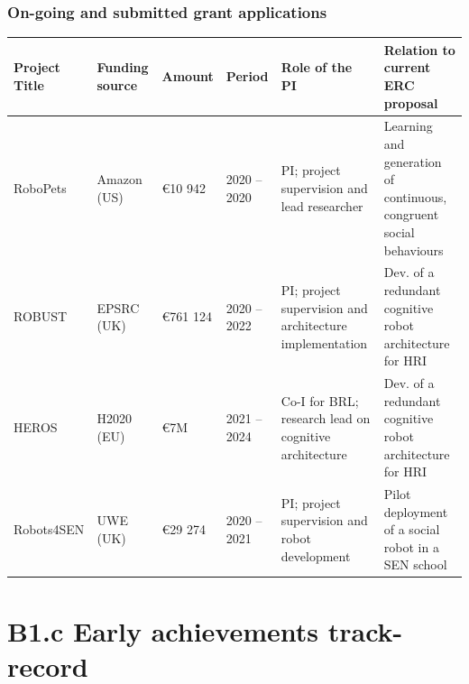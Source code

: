 \documentclass[11pt,a4paper]{report}
\newcommand{\eu}[1]{}
\begin{document}
\subsection{On-going and submitted grant applications}

\begin{tabular}{llllp{4cm}p{4cm}}
\toprule
\textbf{Project Title} & \textbf{Funding source} & \textbf{Amount} & \textbf{Period} & \textbf{Role of the PI} & \textbf{Relation to current  ERC proposal} \\ \midrule
    RoboPets & Amazon (US) & €10 942 & 2020 -- 2020 & PI; project supervision and lead researcher & Learning and generation of continuous, congruent social behaviours \\ \midrule
    ROBUST & EPSRC (UK) & €761 124 & 2020 -- 2022 & PI; project supervision and
    architecture implementation & Dev. of a redundant cognitive robot architecture for HRI \\ \midrule
    HEROS & H2020 (EU) & €7M & 2021 -- 2024 & Co-I for BRL; research
    lead on cognitive architecture & Dev. of a redundant cognitive robot architecture for HRI \\ \midrule
    Robots4SEN & UWE (UK) & €29 274 & 2020 -- 2021 & PI; project supervision and robot development & Pilot deployment of a social robot in a SEN school \\ \bottomrule
\end{tabular}




\newpage
\chapter{B1.c Early achievements track-record}\label{early-achievements-track-record}

\eu{should list your important achievements,
including your most important publications (up to five for Starting Grant and up to ten for
Consolidator Grant) highlighting those as main author and/or without the co-authorship of your PhD
supervisor. The publications should be properly referenced, including all authors in the published
order (Please see section 1.1 on Research integrity). Field relevant bibliometric indicators as well as
research monographs and any translations thereof may also be included. If applicable include:
granted patent(s); invited presentations to internationally established conferences and/or
international advanced schools; Prizes/Awards/Academy memberships etc.}
\eu{(max 2 pages)}
\end{document}
